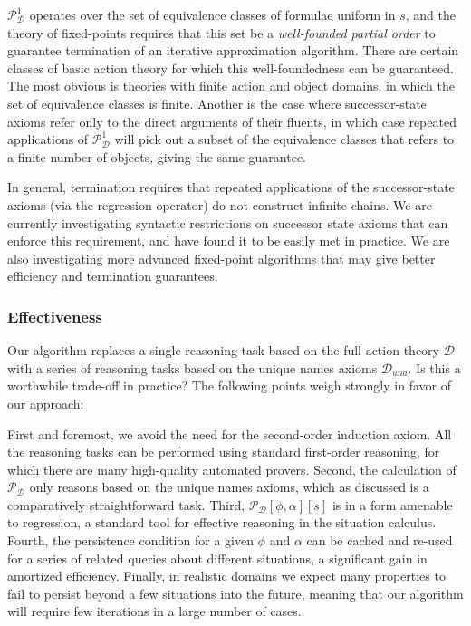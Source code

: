 $\mathcal{P}_{\mathcal{D}}^{1}$ operates over the set of equivalence
classes of formulae uniform in $s$, and the theory of fixed-points
requires that this set be a \emph{well-founded partial order} to guarantee
termination of an iterative approximation algorithm. There are certain
classes of basic action theory for which this well-foundedness can
be guaranteed. The most obvious is theories with finite action and
object domains, in which the set of equivalence classes is finite.
Another is the case where successor-state axioms refer only to the
direct arguments of their fluents, in which case repeated applications
of $\mathcal{P}_{\mathcal{D}}^{1}$ will pick out a subset of the
equivalence classes that refers to a finite number of objects, giving
the same guarantee.

In general, termination requires that repeated applications of the
successor-state axioms (via the regression operator) do not construct
infinite chains. We are currently investigating syntactic restrictions
on successor state axioms that can enforce this requirement, and have
found it to be easily met in practice. We are also investigating more
advanced fixed-point algorithms that may give better efficiency and
termination guarantees.


\subsubsection{Effectiveness}

Our algorithm replaces a single reasoning task based on the full action
theory $\mathcal{D}$ with a series of reasoning tasks based on the
unique names axioms $\mathcal{D}_{una}$. Is this a worthwhile trade-off
in practice? The following points weigh strongly in favor of our approach:

First and foremost, we avoid the need for the second-order induction
axiom. All the reasoning tasks can be performed using standard first-order
reasoning, for which there are many high-quality automated provers.
Second, the calculation of $\mathcal{P_{D}}$ only reasons based on
the unique names axioms, which as discussed is a comparatively straightforward
task. Third, $\mathcal{P}_{\mathcal{D}}[\phi,\alpha][s]$ is in a
form amenable to regression, a standard tool for effective reasoning
in the situation calculus. Fourth, the persistence condition for a
given $\phi$ and $\alpha$ can be cached and re-used for a series
of related queries about different situations, a significant gain
in amortized efficiency. Finally, in realistic domains we expect many
properties to fail to persist beyond a few situations into the future,
meaning that our algorithm will require few iterations in a large
number of cases.

